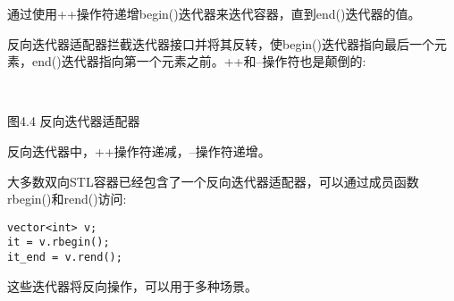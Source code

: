 通过使用++操作符递增begin()迭代器来迭代容器，直到end()迭代器的值。

反向迭代器适配器拦截迭代器接口并将其反转，使begin()迭代器指向最后一个元素，end()迭代器指向第一个元素之前。++和--操作符也是颠倒的:

\hspace*{\fill} \\ %
\begin{center}

图4.4 反向迭代器适配器
\end{center}


反向迭代器中，++操作符递减，--操作符递增。

大多数双向STL容器已经包含了一个反向迭代器适配器，可以通过成员函数rbegin()和rend()访问:

\begin{lstlisting}[style=styleCXX]
vector<int> v;
it = v.rbegin();
it_end = v.rend();
\end{lstlisting}

这些迭代器将反向操作，可以用于多种场景。
